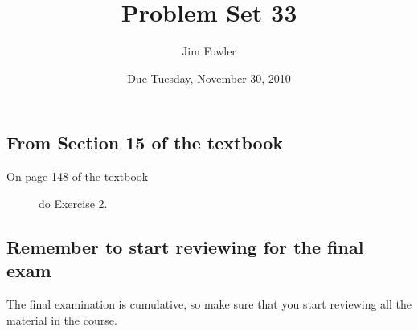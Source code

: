 \documentclass[12pt]{handout}
\author{Jim Fowler}
\title{Problem Set 33}
\date{Due Tuesday, November 30, 2010}
\begin{document}
\maketitle










\subsection*{From Section 15 of the textbook}



\begin{description}

\item[On page 148 of the textbook] do Exercise 2.

\end{description}













\subsection*{Remember to start reviewing for the final exam}
The final examination is cumulative, so make sure that you start reviewing all the material in the course.
\end{document}
